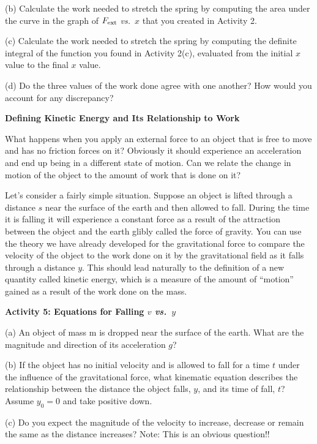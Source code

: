 (b) Calculate the work needed to stretch the spring by computing the area under
the curve in the graph of \( F_{\rm ext} \) \textit{vs.}~$x$ that you created in Activity 2.
\answerspace{20mm}

(c) Calculate the work needed to stretch the spring by computing the definite 
integral of the function you found in Activity 2(c), evaluated from the 
initial $x$ value to the final $x$ value.
\answerspace{20mm}

(d) Do the three values of the work done agree with one another? How would 
you account for any discrepancy?
\answerspace{20mm}


\textbf{Defining Kinetic Energy and Its Relationship to Work} 

What happens when you apply an external force to an object that is free to move
and has no friction forces on it? Obviously it should experience an acceleration
and end up being in a different state of motion. Can we relate the change in
motion of the object to the amount of work that is done on it?

Let's consider a fairly simple situation. Suppose an object is lifted through
a distance $s$ near the surface of the earth and then allowed to fall. During
the time it is falling it will experience a constant force as a result of the
attraction between the object and the earth glibly called the force of gravity.
You can use the theory we have already developed for the gravitational force
to compare the velocity of the object to the work done on it by the gravitational
field as it falls through a distance 
$y$. This should lead naturally to the definition
of a new quantity called kinetic energy, which is a measure of the amount of
``motion'' gained as a result of the work done on the mass. 

\textbf{Activity 5: Equations for Falling $v$ \textit{vs.}~$y$ }

(a) An object of mass m is dropped near the surface of the earth. What are the
magnitude and direction of its acceleration $g$?
\answerspace{10mm}

(b) If the object has no initial velocity and is allowed to fall for a time
$t$ under the influence of the gravitational force, what kinematic equation describes the relationship between the distance the object falls, $y$, and its time of fall, $t$? Assume \( y_{0}=0 \) and take positive down.
\answerspace{10mm}

\pagebreak[2]
(c) Do you expect the magnitude of the velocity to increase, decrease or remain
the same as the distance increases? Note: This is an obvious question!!
\answerspace{10mm}

